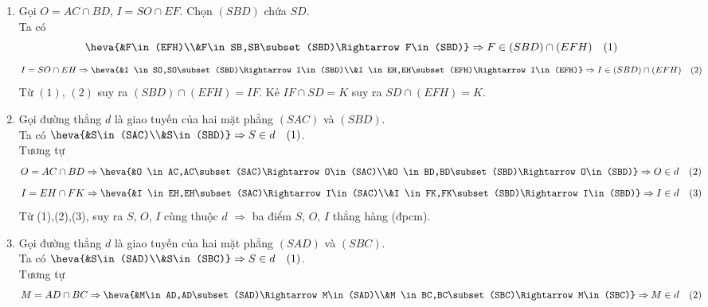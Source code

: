 \begin{bt}
\begin{bt}
{\begin{center}
		\end{center}
		\begin{enumerate}
			\item Gọi $O=AC\cap BD$, $I=SO\cap EF$. Chọn $(SBD)$ chứa $SD$.\\
			Ta có $$\heva{&F\in (EFH)\\&F\in SB,SB\subset (SBD)\Rightarrow F\in(SBD)}\Rightarrow F\in(SBD)\cap(EFH)\quad(1)$$ 
			$$I=SO\cap EH \Rightarrow \heva{&I \in SO,SO\subset (SBD)\Rightarrow I\in(SBD)\\&I \in EH,EH\subset (EFH)\Rightarrow I\in(EFH)}\Rightarrow I\in(SBD)\cap(EFH)\quad(2)$$	
			Từ $(1)$, $(2)$ suy ra $(SBD)\cap(EFH)=IF$. Kẻ $IF\cap SD=K$ suy ra $SD\cap(EFH)=K$.
			\item Gọi đường thẳng $d$ là giao tuyến của hai mặt phẳng $(SAC)$ và $(SBD)$.\\
			Ta có 
			$\heva{&S\in(SAC)\\&S\in(SBD)}\Rightarrow S\in d\quad (1)$.\\
			Tương tự
			$$O=AC\cap BD \Rightarrow \heva{&O \in AC,AC\subset (SAC)\Rightarrow O\in(SAC)\\&O \in BD,BD\subset (SBD)\Rightarrow O\in(SBD)}\Rightarrow O\in d\quad (2)$$
			$$I=EH\cap FK \Rightarrow \heva{&I \in EH,EH\subset (SAC)\Rightarrow I\in(SAC)\\&I \in FK,FK\subset (SBD)\Rightarrow I\in(SBD)}\Rightarrow I\in d\quad (3)$$
			Từ (1),(2),(3), suy ra $S$, $O$, $I$ cùng thuộc $d$ $\Rightarrow$ ba điểm $S$, $O$, $I$ thẳng hàng (đpcm).
			\item Gọi đường thẳng $d$ là giao tuyến của hai mặt phẳng $(SAD)$ và $(SBC)$.\\
			Ta có 
			$\heva{&S\in(SAD)\\&S\in(SBC)}\Rightarrow S\in d\quad (1)$.\\
			Tương tự
			$$M=AD\cap BC \Rightarrow \heva{&M\in AD,AD\subset (SAD)\Rightarrow M\in(SAD)\\&M \in BC,BC\subset (SBC)\Rightarrow M\in(SBC)}\Rightarrow M\in d\quad (2)$$

\end{enumerate}}
\end{bt}
\end{bt}
